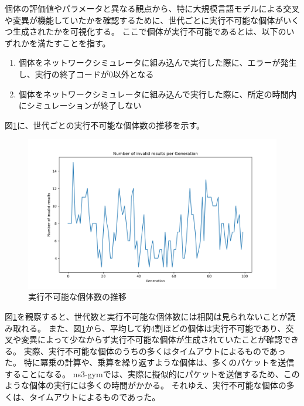 \documentclass[a4paper,11pt]{jreport}
\newcommand{\figref}[1]{図\ref{#1}}
\begin{document}
個体の評価値やパラメータと異なる観点から、特に大規模言語モデルによる交叉や変異が機能していたかを確認するために、世代ごとに実行不可能な個体がいくつ生成されたかを可視化する。
ここで個体が実行不可能であるとは、以下のいずれかを満たすことを指す。
\begin{enumerate}
  \item 個体をネットワークシミュレータに組み込んで実行した際に、エラーが発生し、実行の終了コードが0以外となる
  \item 個体をネットワークシミュレータに組み込んで実行した際に、所定の時間内にシミュレーションが終了しない
\end{enumerate}
\figref{figure:invalid_results}に、世代ごとの実行不可能な個体数の推移を示す。
\begin{figure}[htbp]
  \setlength\fboxsep{0pt}
  \centering
  \includegraphics[width=1.0\linewidth]{fig/chap05/invalid_results.png}
  \caption{実行不可能な個体数の推移}
  \label{figure:invalid_results}
\end{figure}
\figref{figure:invalid_results}を観察すると、世代数と実行不可能な個体数には相関は見られないことが読み取れる。
また、\figref{figure:invalid_results}から、平均して約4割ほどの個体は実行不可能であり、交叉や変異によって少なからず実行不可能な個体が生成されていたことが確認できる。
実際、実行不可能な個体のうちの多くはタイムアウトによるものであった。
特に冪乗の計算や、乗算を繰り返すような個体は、多くのパケットを送信することになる。
ns3-gymでは、実際に擬似的にパケットを送信するため、このような個体の実行には多くの時間がかかる。
それゆえ、実行不可能な個体の多くは、タイムアウトによるものであった。
\end{document}
